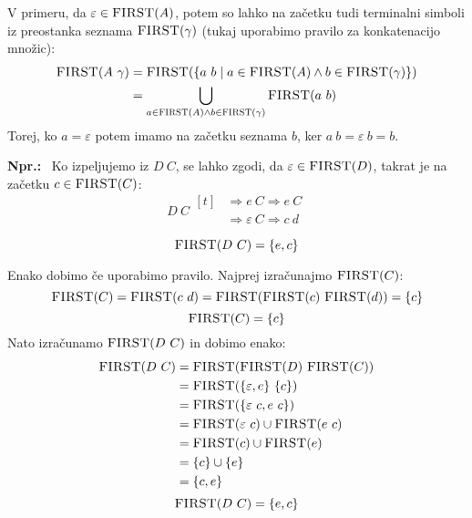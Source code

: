 \documentclass{article}
\newcommand{\Ex}{\textbf{Npr.:}\ }
\newcommand{\FIRST}{\textsc{FIRST}}
\newcommand{\Null}{\varepsilon}
\newcommand{\Derive}{\Rightarrow}
\newcommand{\Seq}{\ }
\begin{document}
V primeru, da $\varepsilon \in \FIRST(A)$, potem so lahko na začetku tudi terminalni simboli iz preostanka seznama $\FIRST(\gamma)$ (tukaj uporabimo pravilo za konkatenacijo množic):
\begin{align*}
  \FIRST(A \Seq \gamma) &= \FIRST(\{a \Seq b \mid a \in \FIRST(A) \land b \in \FIRST(\gamma)\})\\
   &= \bigcup_{a \in \FIRST(A) \land b \in \FIRST(\gamma)} \FIRST(a \Seq b)
\end{align*}
Torej, ko $a = \Null$ potem imamo na začetku seznama $b$, ker $a \Seq b = \Null \Seq b = b$.

\Ex
  Ko izpeljujemo iz $D \Seq C$, se lahko zgodi, da $\Null \in \FIRST(D)$, takrat je na začetku $c \in \FIRST(C)$:
  \begin{equation*}
    D \Seq C \begin{aligned}[t]
      &\Derive e \Seq C \Derive e \Seq C \\
      &\Derive \Null \Seq C \Derive c \Seq d \\
    \end{aligned}
  \end{equation*}
  \begin{equation*}
    \FIRST(D \Seq C) = \{e, c\}
  \end{equation*}

  Enako dobimo če uporabimo pravilo.
  Najprej izračunajmo $\FIRST(C)$:
  \begin{equation*}
    \FIRST(C) = \FIRST(c \Seq d) = \FIRST(\FIRST(c) \Seq \FIRST(d)) = \{c\}
  \end{equation*}
  \begin{equation*}
    \FIRST(C) = \{c\}
  \end{equation*}
  Nato izračunamo $\FIRST(D \Seq C)$ in dobimo enako:
  \begin{equation*}
    \begin{aligned}
      \FIRST(D \Seq C) &= \FIRST(\FIRST(D) \Seq \FIRST(C))\\
                &= \FIRST(\{\Null, e\} \Seq \{c\})\\
                &= \FIRST(\{\Null \Seq c, e \Seq c\})\\
                &= \FIRST(\Null \Seq c) \cup \FIRST(e \Seq c)\\
                &= \FIRST(c) \cup \FIRST(e)\\
                &= \{c\} \cup \{e\}\\
                &= \{c, e\}
    \end{aligned}
  \end{equation*}
  \begin{equation*}
    \FIRST(D \Seq C) = \{e, c\}
  \end{equation*}
\end{document}
